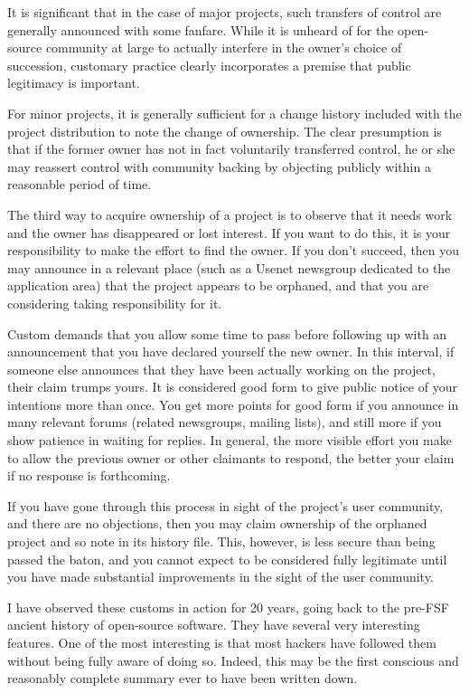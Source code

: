 It is significant that in the case of major projects, such transfers of control
are generally announced with some fanfare.  While it is unheard of for the
open-source community at large to actually interfere in the owner's choice of
succession, customary practice clearly incorporates a premise that public
legitimacy is important.

For minor projects, it is generally sufficient for a change history included
with the project distribution to note the change of ownership.  The clear
presumption is that if the former owner has not in fact voluntarily transferred
control, he or she may reassert control with community backing by objecting
publicly within a reasonable period of time.

The third way to acquire ownership of a project is to observe that it needs work
and the owner has disappeared or lost interest.  If you want to do this, it is
your responsibility to make the effort to find the owner.  If you don't succeed,
then you may announce in a relevant place (such as a Usenet newsgroup dedicated
to the application area) that the project appears to be orphaned, and that you
are considering taking responsibility for it.

Custom demands that you allow some time to pass before following up with an
announcement that you have declared yourself the new owner.  In this interval,
if someone else announces that they have been actually working on the project,
their claim trumps yours.  It is considered good form to give public notice of
your intentions more than once.  You get more points for good form if you
announce in many relevant forums (related newsgroups, mailing lists), and still
more if you show patience in waiting for replies.  In general, the more visible
effort you make to allow the previous owner or other claimants to respond, the
better your claim if no response is forthcoming.

If you have gone through this process in sight of the project's user community,
and there are no objections, then you may claim ownership of the orphaned
project and so note in its history file.  This, however, is less secure than
being passed the baton, and you cannot expect to be considered fully legitimate
until you have made substantial improvements in the sight of the user community.

I have observed these customs in action for 20 years, going back to the pre-FSF
ancient history of open-source software.  They have several very interesting
features.  One of the most interesting is that most hackers have followed them
without being fully aware of doing so.  Indeed, this may be the first conscious
and reasonably complete summary ever to have been written down.

